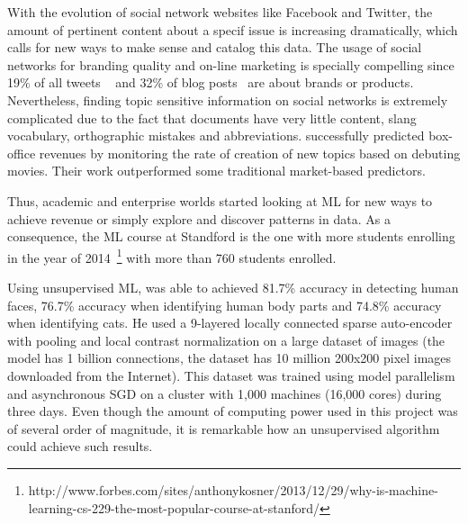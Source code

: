 With the evolution of social network websites like Facebook and Twitter, the amount of pertinent content about a specif issue is increasing dramatically, which calls for new ways to make sense and catalog this data.
The usage of social networks for branding quality and on-line marketing is specially compelling since 19\% of all tweets ~\cite{Jansen2009} and 32\% of blog posts~\cite{Melville2009} are about brands or products. Nevertheless, finding topic sensitive information on social networks is extremely complicated due to the fact that documents have very little content, slang vocabulary, orthographic mistakes and abbreviations. \citet{Asur2010} successfully predicted box-office revenues by monitoring the rate of creation of new topics based on debuting movies. Their work outperformed some traditional market-based predictors.

Thus, academic and enterprise worlds started looking at \ac{ML} for new ways to achieve revenue or simply explore and discover patterns in data. 
As a consequence, the \ac{ML} course at Standford is the one with more students enrolling in the year of 2014~\footnote{http://www.forbes.com/sites/anthonykosner/2013/12/29/why-is-machine-learning-cs-229-the-most-popular-course-at-stanford/} with more than 760 students enrolled.

Using unsupervised \ac{ML}, \citet{Le2011} was able to achieved 81.7\% accuracy in detecting human faces, 76.7\% accuracy when identifying human body parts and 74.8\% accuracy when identifying cats. He used a 9-layered locally connected sparse auto-encoder with pooling and local contrast normalization on a large dataset of images (the model has 1 billion connections, the dataset has 10 million 200x200 pixel images downloaded from the Internet). This dataset was trained using model parallelism and asynchronous SGD on a cluster with 1,000 machines (16,000 cores) during three days. Even though the amount of computing power used in this project was of several order of magnitude, it is remarkable how an unsupervised algorithm could achieve such results.

